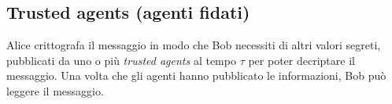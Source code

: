 

\subsection{Trusted agents (agenti fidati)}
\label{subsec:trusted-agents}
Alice crittografa il messaggio in modo che Bob necessiti di altri valori segreti,
pubblicati da uno o più \textit{trusted agents} al tempo $ \tau $ per poter
decriptare il messaggio. Una volta che gli agenti hanno pubblicato le informazioni,
Bob può leggere il messaggio.
